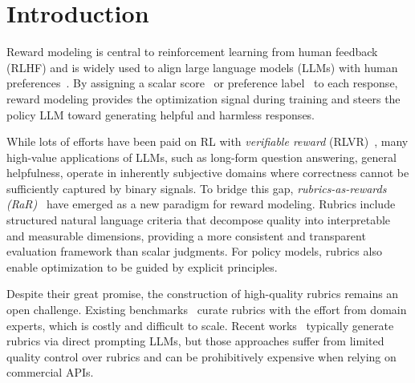 \vspace{-2mm}
\section{Introduction}
\label{sec:intro}
\vspace{-1mm}
Reward modeling is central to reinforcement learning from human feedback (RLHF) and is widely used to align large language models (LLMs) with human preferences~\citep{ouyang2022training,wu2023fine,bhaskar2025language}. 
By assigning a scalar score~\citep{ouyang2022training} or preference label~\citep{chen2025rm} to each response, reward modeling provides the optimization signal during training and steers the policy LLM toward generating helpful and harmless responses.

While lots of efforts have been paid on RL with \emph{verifiable reward} (RLVR)~\citep{guo2025deepseek,yue2025does}, many high-value applications of LLMs, such as long-form question answering, general helpfulness, operate in inherently subjective domains where correctness cannot be sufficiently captured by binary signals. 
To bridge this gap, \emph{rubrics-as-rewards (RaR)}~\citep{gunjal2025rubrics} have emerged as a new paradigm for reward modeling. 
Rubrics include structured natural language criteria that decompose quality into interpretable and measurable dimensions, providing a more consistent and transparent evaluation framework than scalar judgments. For policy models, rubrics also enable optimization to be guided by explicit principles.

Despite their great promise, the construction of high-quality rubrics remains an open challenge. Existing benchmarks~\citep{arora2025healthbench} curate rubrics with the effort from domain experts, which is costly and difficult to scale. Recent works~\citep{huang2025reinforcement,viswanathan2025checklists,gunjal2025rubrics} typically generate rubrics via direct prompting LLMs, but those approaches suffer from limited quality control over rubrics and can be prohibitively expensive when relying on commercial APIs.



